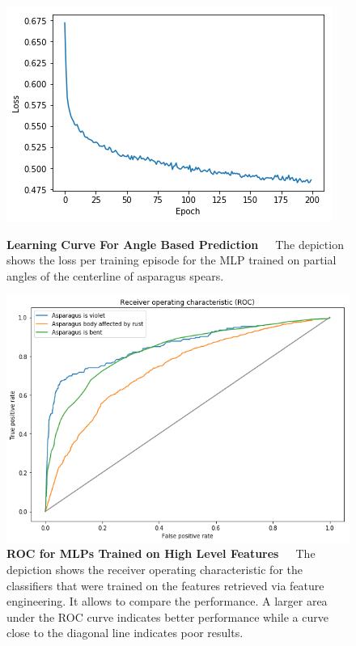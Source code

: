 \begin{figure}[H]
	\centering
	\includegraphics[scale=0.7]{Figures/chapter04/fe_curve}
	\decoRule
	\caption[Learning Curve For Angle Based Prediction]{\textbf{Learning Curve For Angle Based Prediction}~~~The depiction shows the loss per training episode for the MLP trained on partial angles of the centerline of asparagus spears.}
	\label{fig:FeatureEngineeringCurve}
	\vspace{2cm}
	\centering
	\includegraphics[scale=0.6]{Figures/chapter04/fe_roc}
	\caption[ROC for MLPs Trained on High Level Features]{\textbf{ROC for MLPs Trained on High Level Features}~~~The depiction shows the receiver operating characteristic for the classifiers that were trained on the features retrieved via feature engineering. It allows to compare the performance. A larger area under the ROC curve indicates better performance while a curve close to the diagonal line indicates poor results.}
	\label{fig:FeatureEngineeringROC}
\end{figure}


